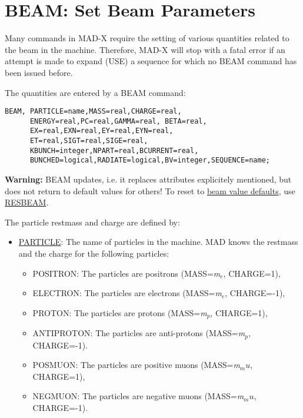 
\section{BEAM: Set Beam Parameters}
\label{sec:beam}

Many commands in MAD-X require the setting of various quantities related
to the beam in the machine. Therefore, MAD-X will stop with a fatal
error if an attempt is made to expand (USE) a sequence for which no BEAM
command has been issued before.  

The quantities are entered by a BEAM command: 
\begin{verbatim}
BEAM, PARTICLE=name,MASS=real,CHARGE=real,
      ENERGY=real,PC=real,GAMMA=real, BETA=real,
      EX=real,EXN=real,EY=real,EYN=real,
      ET=real,SIGT=real,SIGE=real,
      KBUNCH=integer,NPART=real,BCURRENT=real,
      BUNCHED=logical,RADIATE=logical,BV=integer,SEQUENCE=name;
\end{verbatim} 

{\bf Warning:} BEAM updates, i.e. it replaces attributes explicitely
mentioned, but does not return to default values for others! To reset to
\href{resbeam.html#defaults}{beam value defaults},  use
\href{resbeam.html}{RESBEAM}.

The particle restmass and charge \label{beam_charge} are defined by:
\begin{itemize}
   \item \href{particle}{PARTICLE}: The name of particles in the
     machine. MAD knows the restmass and the charge for the
     following particles:  
     \begin{itemize}
	  \item POSITRON: The particles are positrons (MASS=\textit{m$_e$}, CHARGE=1), 
	  \item ELECTRON: The particles are electrons (MASS=\textit{m$_e$}, CHARGE=-1), 
	  \item PROTON: The particles are protons (MASS=\textit{m$_p$}, CHARGE=1), 
	  \item ANTIPROTON: The particles are anti-protons (MASS=\textit{m$_p$}, CHARGE=-1). 
	  \item POSMUON: The particles are positive muons (MASS=\textit{m$_mu$}, CHARGE=1), 
	  \item NEGMUON: The particles are negative muons (MASS=\textit{m$_mu$}, CHARGE=-1). 
     \end{itemize}
\end{itemize} 

